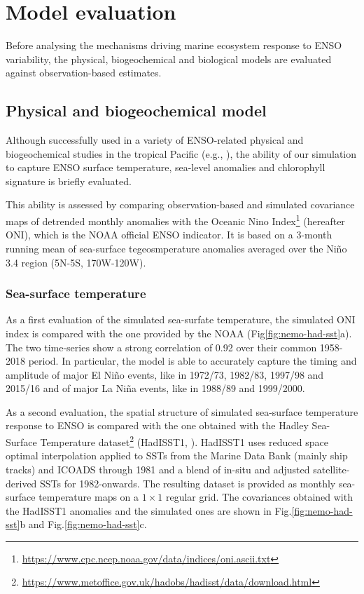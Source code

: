 \section{Model evaluation}

Before analysing the mechanisms driving marine ecosystem response to ENSO variability, the physical, biogeochemical and biological models are evaluated against observation-based estimates.

\subsection{Physical and biogeochemical model}

Although successfully used in a variety of ENSO-related physical and biogeochemical studies in the tropical Pacific (e.g., \citealt{vialardModelStudyOceanic2001, lengaigneOceanResponseMarch2002, lengaigneInfluenceOceanicBiology2007, schneiderClimateinducedInterannualVariability2008, masottiLargescaleShiftsPhytoplankton2011, currieIndianOceanDipole2013}), the ability of our simulation to capture ENSO surface temperature, sea-level anomalies and chlorophyll signature is briefly evaluated. 

This ability is assessed by comparing observation-based and simulated covariance maps of detrended monthly anomalies with the Oceanic Nino Index\footnote{\url{https://www.cpc.ncep.noaa.gov/data/indices/oni.ascii.txt}} (hereafter ONI), which is the NOAA official ENSO indicator. It is based on a 3-month running mean of sea-surface tegeosmperature anomalies averaged over the Niño 3.4 region (5N-5S, 170W-120W).

\subsubsection{Sea-surface temperature}
\label{sec:sst}

As a first evaluation of the simulated sea-surfate temperature, the simulated ONI index is compared with the one provided by the NOAA (Fig\ref{fig:nemo-had-sst}a). The two time-series show a strong correlation of 0.92 over their common 1958-2018 period. In particular, the model is able to accurately capture the timing and amplitude of major El Niño events, like in 1972/73, 1982/83, 1997/98 and 2015/16 and of major La Niña events, like in 1988/89 and 1999/2000. 

As a second evaluation, the spatial structure of simulated sea-surface temperature response to ENSO is compared with the one obtained with the Hadley Sea-Surface Temperature dataset\footnote{\url{https://www.metoffice.gov.uk/hadobs/hadisst/data/download.html}} (HadISST1, \citealt{raynerGlobalAnalysesSea2003}). HadISST1 uses reduced space optimal interpolation applied to SSTs from the Marine Data Bank (mainly ship tracks) and ICOADS through 1981 and a blend of in-situ and adjusted satellite-derived SSTs for 1982-onwards. The resulting dataset is provided as monthly sea-surface temperature maps on a $1\times 1$ regular grid. The covariances obtained with the HadISST1 anomalies and the simulated ones are shown in Fig.\ref{fig:nemo-had-sst}b and Fig.\ref{fig:nemo-had-sst}c.

